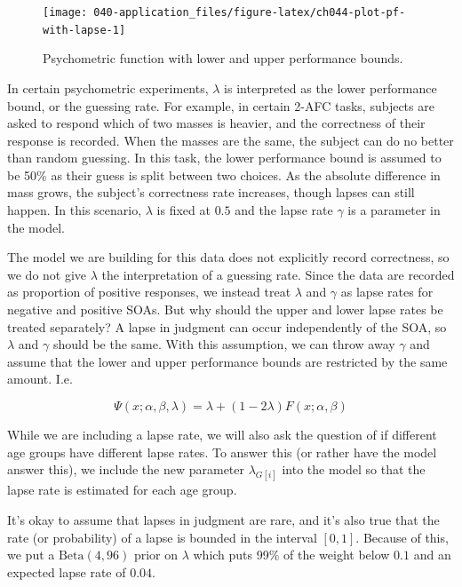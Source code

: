 \documentclass[11pt, oneside, openany]{scrbook}
\begin{document}
\begin{figure}

{\centering \texttt{[image: 040-application\_files/figure-latex/ch044-plot-pf-with-lapse-1]} 

}

\caption{Psychometric function with lower and upper performance bounds.}\label{fig:ch044-plot-pf-with-lapse}
\end{figure}

In certain psychometric experiments, \(\lambda\) is interpreted as the lower performance bound, or the guessing rate. For example, in certain 2-AFC tasks, subjects are asked to respond which of two masses is heavier, and the correctness of their response is recorded. When the masses are the same, the subject can do no better than random guessing. In this task, the lower performance bound is assumed to be 50\% as their guess is split between two choices. As the absolute difference in mass grows, the subject's correctness rate increases, though lapses can still happen. In this scenario, \(\lambda\) is fixed at \(0.5\) and the lapse rate \(\gamma\) is a parameter in the model.

The model we are building for this data does not explicitly record correctness, so we do not give \(\lambda\) the interpretation of a guessing rate. Since the data are recorded as proportion of positive responses, we instead treat \(\lambda\) and \(\gamma\) as lapse rates for negative and positive SOAs. But why should the upper and lower lapse rates be treated separately? A lapse in judgment can occur independently of the SOA, so \(\lambda\) and \(\gamma\) should be the same. With this assumption, we can throw away \(\gamma\) and assume that the lower and upper performance bounds are restricted by the same amount. I.e.

\begin{equation}
  \Psi(x; \alpha, \beta, \lambda) = \lambda + (1 - 2\lambda) F(x; \alpha, \beta)
  \label{eq:Psi}
\end{equation}

While we are including a lapse rate, we will also ask the question of if different age groups have different lapse rates. To answer this (or rather have the model answer this), we include the new parameter \(\lambda_{G[i]}\) into the model so that the lapse rate is estimated for each age group.

It's okay to assume that lapses in judgment are rare, and it's also true that the rate (or probability) of a lapse is bounded in the interval \([0, 1]\). Because of this, we put a \(\mathrm{Beta(4, 96)}\) prior on \(\lambda\) which puts 99\% of the weight below \(0.1\) and an expected lapse rate of \(0.04\).
\end{document}
